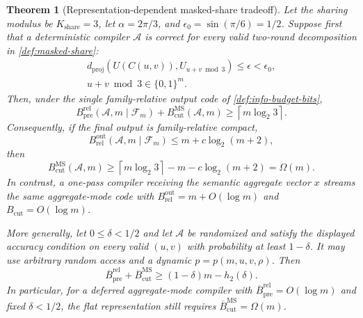 \documentclass[aps,prx,reprint,floatfix,superscriptaddress]{revtex4-2}
\newtheorem{theorem}{Theorem}
\begin{document}
\begin{theorem}[Representation-dependent masked-share tradeoff]
\label{thm:main-tradeoff}
Let the sharing modulus be $K_{\mathrm{share}}=3$, let $\alpha=2\pi/3$, and
$\epsilon_0=\sin(\pi/6)=1/2$.  Suppose first that a deterministic compiler
$\mathcal A$ is correct for \emph{every} valid two-round decomposition in
\cref{def:masked-share}:
\begin{equation*}
\begin{gathered}
 d_{\mathrm{proj}}(U(C(u,v)),U_{u+v\bmod 3})
 \leq\epsilon<\epsilon_0,\\
 u+v\bmod3\in\{0,1\}^m.
\end{gathered}
\end{equation*}
Then, under the single family-relative output code of
\cref{def:info-budget-bits},
\begin{equation}\label{eq:main-tradeoff}
 B_{\mathrm{pre}}^{\mathrm{rel}}(\mathcal A,m\mid\mathcal F_m)
 +B_{\mathrm{cut}}^{\mathrm{MS}}(\mathcal A,m)
 \geq \left\lceil m\log_2 3\right\rceil.
\end{equation}
Consequently, if the final output is family-relative compact,
\begin{equation*}
 B_{\mathrm{rel}}^{\mathrm{out}}(\mathcal A,m\mid\mathcal F_m)
 \leq m+c\log_2(m+2),
\end{equation*}
then
\begin{equation}\label{eq:compact-cut-floor}
 B_{\mathrm{cut}}^{\mathrm{MS}}(\mathcal A,m)
 \geq \left\lceil m\log_2 3\right\rceil
       -m-c\log_2(m+2)=\Omega(m).
\end{equation}
In contrast, a one-pass compiler receiving the semantic aggregate vector
$x$ streams the same aggregate-mode code with
$B_{\mathrm{rel}}^{\mathrm{out}}=m+O(\log m)$ and
$B_{\mathrm{cut}}=O(\log m)$.

More generally, let $0\leq\delta<1/2$ and let $\mathcal A$ be randomized
and satisfy the displayed
accuracy condition on every valid $(u,v)$ with probability at least
$1-\delta$.  It may use arbitrary random access and a dynamic
$p=p(m,u,v,\rho)$.  Then
\begin{equation}\label{eq:randomized-main-tradeoff}
 \overline B_{\mathrm{pre}}^{\mathrm{rel}}
 +\overline B_{\mathrm{cut}}^{\mathrm{MS}}
 \geq(1-\delta)m-h_2(\delta).
\end{equation}
In particular, for a deferred aggregate-mode compiler with
$\overline B_{\mathrm{pre}}^{\mathrm{rel}}=O(\log m)$ and fixed
$\delta<1/2$, the flat representation still requires
$\overline B_{\mathrm{cut}}^{\mathrm{MS}}=\Omega(m)$.
\end{theorem}
\end{document}
